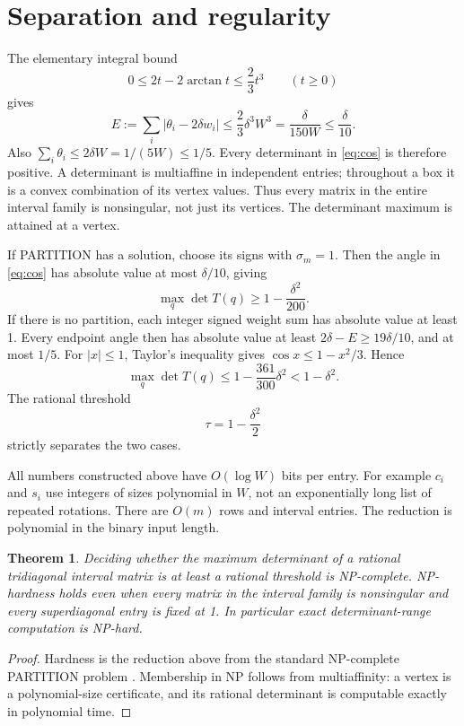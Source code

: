 \documentclass[11pt,a4paper]{article}
\newtheorem{theorem}{Theorem}
\theoremstyle{remark}\newtheorem{remark}[theorem]{Remark}
\begin{document}
\section{Separation and regularity}
The elementary integral bound
\[
 0\le2t-2\arctan t\le\frac23t^3\qquad(t\ge0)
\]
gives
\[
 E:=\sum_i|\theta_i-2\delta w_i|
 \le\frac23\delta^3W^3=\frac{\delta}{150W}\le\frac\delta{10}.
\]
Also $\sum_i\theta_i\le2\delta W=1/(5W)\le1/5$. Every determinant in \eqref{eq:cos} is therefore positive. A determinant is multiaffine in independent entries; throughout a box it is a convex combination of its vertex values. Thus every matrix in the entire interval family is nonsingular, not just its vertices. The determinant maximum is attained at a vertex.

If PARTITION has a solution, choose its signs with $\sigma_m=1$. Then the angle in \eqref{eq:cos} has absolute value at most $\delta/10$, giving
\[
 \max_q\det T(q)\ge1-\frac{\delta^2}{200}.
\]
If there is no partition, each integer signed weight sum has absolute value at least 1. Every endpoint angle then has absolute value at least $2\delta-E\ge19\delta/10$, and at most $1/5$. For $|x|\le1$, Taylor's inequality gives $\cos x\le1-x^2/3$. Hence
\[
 \max_q\det T(q)\le1-\frac{361}{300}\delta^2<1-\delta^2.
\]
The rational threshold
\[
 \tau=1-\frac{\delta^2}{2}
\]
strictly separates the two cases.

All numbers constructed above have $O(\log W)$ bits per entry. For example $c_i$ and $s_i$ use integers of sizes polynomial in $W$, not an exponentially long list of repeated rotations. There are $O(m)$ rows and interval entries. The reduction is polynomial in the binary input length.
\begin{theorem}\label{thm:det}
Deciding whether the maximum determinant of a rational tridiagonal interval matrix is at least a rational threshold is NP-complete. NP-hardness holds even when every matrix in the interval family is nonsingular and every superdiagonal entry is fixed at 1. In particular exact determinant-range computation is NP-hard.
\end{theorem}
\begin{proof}
Hardness is the reduction above from the standard NP-complete PARTITION problem \cite{karp}. Membership in NP follows from multiaffinity: a vertex is a polynomial-size certificate, and its rational determinant is computable exactly in polynomial time.
\end{proof}
\end{document}
